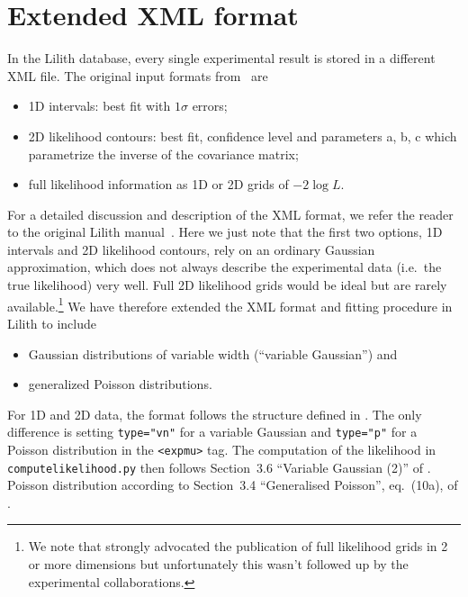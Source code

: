 \clearpage
\section{Extended XML format} \label{sec:xml}

In the Lilith database, every single experimental result is stored in a different XML file. 
The original input formats from~\cite{Bernon:2015hsa} are 
\begin{itemize} 
\item 1D intervals: best fit with $1\sigma$ errors; 
\item 2D likelihood contours: best fit, confidence level and parameters a, b, c which parametrize the inverse of the covariance matrix;
\item full likelihood information as 1D or 2D grids of $-2\log L$.
\end{itemize}
For a detailed discussion and description of the XML format, we refer the reader to the original Lilith manual~\cite{Bernon:2015hsa}. 
Here we just note that the first two options, 1D intervals and 2D likelihood contours, rely on an ordinary Gaussian approximation, 
which does not always describe the experimental data (i.e.\ the true likelihood) very well. 
Full 2D likelihood grids would be ideal but are rarely available.\footnote{We note that \cite{Boudjema:2013qla} strongly advocated 
the publication of full likelihood grids in 2 or more dimensions but unfortunately this wasn't followed up by the experimental collaborations.} 
We have therefore extended the XML format and fitting procedure in Lilith to include 
\begin{itemize} 
\item Gaussian distributions of variable width (``variable Gaussian'') and 
\item generalized Poisson distributions. 
\end{itemize}
For 1D and 2D data, the format follows the structure defined in \cite{Bernon:2015hsa}. The only difference is setting {\tt type="vn"} for a variable Gaussian and
{\tt type="p"} for a Poisson distribution in the {\tt <expmu>} tag. %
The computation of the likelihood in {\tt computelikelihood.py} then follows Section~3.6 ``Variable Gaussian (2)'' of \cite{Barlow:2004wg}. 
Poisson distribution according to Section~3.4 ``Generalised Poisson'', eq.~(10a), of \cite{Barlow:2004wg}. 


